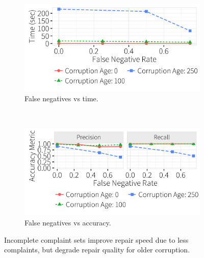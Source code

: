     
\begin{figure}[!htb]
  \hspace*{-.1in}
  \centering
    \begin{subfigure}[t]{.33\textwidth}
      \includegraphics[width = .99\columnwidth]{figures/noise_fn_time_fulllabel} 
      \vspace*{-.1in}
      \caption{False negatives vs time.}
      \label{f:falsenegative_time} 
    \end{subfigure}
    \\
    \begin{subfigure}[t]{.33\textwidth}
      \includegraphics[width = .99\columnwidth]{figures/noise_fn_acc_fulllabel}
      \vspace*{-.1in}
      \caption{False negatives vs accuracy.}
      \label{f:falsenegative_acc} 
    \end{subfigure}
    \vspace*{-.1in}
    \caption{Incomplete complaint sets improve repair speed due to less complaints, but degrade repair quality for older corruption. }
  \end{figure}



